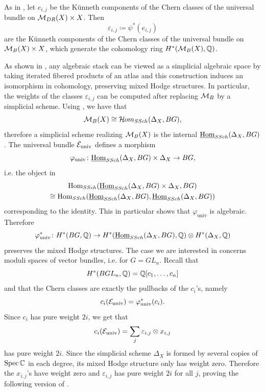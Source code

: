As in , let $e_{i,j}$ be the K\"unneth components of the Chern classes of the universal bundle on $\mathcal{M}_{DR}(X)\times X$. Then
\begin{equation}
\varepsilon_{i,j} \coloneqq \psi^*(e_{i,j})
\end{equation}
are the K\"unneth components of the Chern classes of the universal bundle on $\mathcal{M}_B(X) \times X$, which generate the cohomology ring $H^*(\mathcal{M}_B(X), \mathbb{Q})$.

As shown in \cite[\S 4]{Olsson-sheaves-on-artin-stacks}, any algebraic stack can be viewed as a simplicial algebraic space by taking iterated fibered products of an atlas and this construction induces an isomorphism in cohomology, preserving mixed Hodge structures. In particular, the weights of the classes $\varepsilon_{i,j}$ can be computed after replacing $\mathcal{M}_B$ by a simplicial scheme. Using , we have that
\begin{equation}
\mathcal{M}_B(X) \cong \mathcal{H}\kern -.5pt om_{SSch}(\Delta_X, BG),
\end{equation}
therefore a simplicial scheme realizing $\mathcal{M}_B(X)$ is the internal $\underline{\operatorname{Hom}}_{SSch}(\Delta_X, BG)$. The universal bundle $\mathcal{E}_{\text{univ}}$ defines a morphism
\begin{equation}
\varphi_{\text{univ}}\colon \underline{\operatorname{Hom}}_{SSch}(\Delta_X, BG) \times \Delta_X \to BG,
\end{equation}
i.e. the object in
\begin{multline}
\operatorname{Hom}_{SSch}(\underline{\operatorname{Hom}}_{SSch}(\Delta_X, BG) \times \Delta_X, BG) \\
\cong \operatorname{Hom}_{SSch}(\underline{\operatorname{Hom}}_{SSch}(\Delta_X, BG), \underline{\operatorname{Hom}}_{SSch}(\Delta_X, BG))
\end{multline}
corresponding to the identity. This in particular shows that $\varphi_{\text{univ}}$ is algebraic.
Therefore
\begin{equation}
\varphi_{\text{univ}}^* \colon H^*(BG, \mathbb{Q}) \to H^*(\underline{\operatorname{Hom}}_{SSch}(\Delta_X, BG), \mathbb{Q}) \otimes H^*(\Delta_X, \mathbb{Q})
\end{equation}
preserves the mixed Hodge structures. The case we are interested in concerns moduli spaces of vector bundles, i.e. for $G = GL_n$. Recall that
\begin{equation}
H^*(BGL_n, \mathbb{Q}) = \mathbb{Q}[c_1, \dots, c_n]
\end{equation}
and that the Chern classes are exactly the pullbacks of the $c_i$'s, namely
\begin{equation}
c_i(\mathcal{E}_{\text{univ}}) = \varphi_{\text{univ}}^*(c_i).
\end{equation}
Since $c_i$ has pure weight $2i$, we get that
\begin{equation}
c_i(\mathcal{E}_{\text{univ}}) = \sum_{j} \varepsilon_{i,j} \otimes x_{i,j}
\end{equation}
has pure weight $2i$. Since the simplicial scheme $\Delta_X$ is formed by several copies of $\operatorname{Spec} \mathbb{C}$ in each degree, its mixed Hodge structure only has weight zero. Therefore the $x_{i,j}$'s have weight zero and $\varepsilon_{i,j}$ has pure weight $2i$ for all $j$, proving the following version of .

